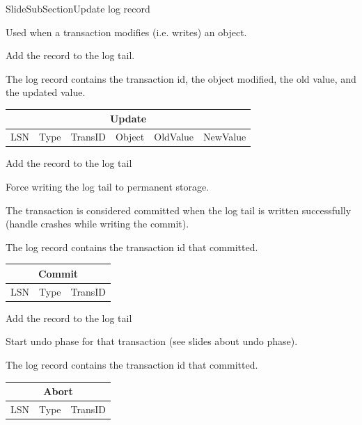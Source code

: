 \documentclass{beamer}
\begin{document}
SlideSubSection{Update log record}
\begin{slide}{
	\item Used when a transaction modifies (i.e. writes) an object.
	\item Add the record to the log tail.
	\item The log record contains the transaction id, the object modified, the old value, and the updated value.
	\begin{table}
		\begin{tabular}{|c|c|c|c|c|c|}
			\hline
			\multicolumn{6}{|c|}{\textbf{Update}} \\
			\hline
			LSN & Type & TransID & Object & OldValue & NewValue \\
			\hline
		\end{tabular}
	\end{table}
}\end{slide}

\begin{slide}{
	\item Add the record to the log tail
	\item Force writing the log tail to permanent storage.
	\item The transaction is considered committed when the log tail is written successfully (handle crashes while writing the commit).
	\item The log record contains the transaction id that committed.
	\begin{table}
		\begin{tabular}{|c|c|c|}
			\hline
			\multicolumn{3}{|c|}{\textbf{Commit}} \\
			\hline
			LSN & Type & TransID \\
			\hline
		\end{tabular}
	\end{table}
}\end{slide}

\begin{slide}{
	\item Add the record to the log tail
	\item Start undo phase for that transaction (see slides about undo phase).
	\item The log record contains the transaction id that committed.
	\begin{table}
		\begin{tabular}{|c|c|c|}
			\hline
			\multicolumn{3}{|c|}{\textbf{Abort}} \\
			\hline
			LSN & Type & TransID \\
			\hline
		\end{tabular}
	\end{table}
}\end{slide}
\end{document}
